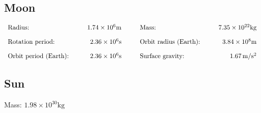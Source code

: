 \documentclass[12pt,a4paper]{article}
\begin{document}
\subsection{Moon}
\begin{align*}
  \begin{array}{l@{\hspace{1cm}}r@{\hspace{1cm}}l@{\hspace{1cm}}r}
    \text{Radius:} & 1.74 \times 10^6 \mathrm{m} & \text{Mass:} & 7.35 \times 10^{22} \mathrm{kg} \\[1em]
    \text{Rotation period:} & 2.36 \times 10^6 \mathrm{s} & \text{Orbit radius (Earth):} & 3.84 \times 10^8 \mathrm{m} \\[1em]
    \text{Orbit period (Earth):} & 2.36 \times 10^6 \mathrm{s} & \text{Surface gravity:} & 1.67 \, \mathrm{m/s^2}
\end{array}
\end{align*}

\subsection{Sun}
Mass: $1.98 \times 10^{30} \mathrm{kg}$
\end{document}
